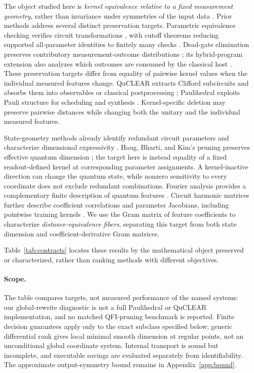 \documentclass[a4paper,twocolumn,11pt,unpublished]{quantumarticle}
\begin{document}
The object studied here is \emph{kernel equivalence relative to a fixed
measurement geometry}, rather than invariance under symmetries of
the input data \cite{larocca,meyer}. Prior methods address several
distinct preservation targets. Parametric equivalence checking
verifies circuit transformations \cite{peham}, with cutoff theorems
reducing supported all-parameter identities to finitely many checks
\cite{rosswesley}. Dead-gate elimination preserves contributory
measurement-outcome distributions \cite{deadgate}; its hybrid-program
extension also analyzes which outcomes are consumed by the classical
host \cite{deadgatejournal}. These preservation targets differ from
equality of pairwise kernel values when the individual measured
features change. QuCLEAR extracts
Clifford subcircuits and absorbs them into observables or classical
postprocessing \cite{quclear}; Paulihedral exploits Pauli structure
for scheduling and synthesis \cite{paulihedral}. Kernel-specific
deletion may preserve pairwise distances while changing both the
unitary and the individual measured features.

State-geometry methods already identify redundant circuit parameters
and characterize dimensional expressivity \cite{funcke,haug}.
Haug, Bharti, and Kim's pruning preserves effective quantum dimension
\cite{haug}; the target here is instead equality of a fixed
readout-defined kernel at corresponding parameter assignments.
A kernel-inactive direction can change the quantum state, while
nonzero sensitivity to every coordinate does not exclude redundant
combinations. Fourier analysis provides a complementary finite
description of quantum features \cite{schuldFourier}. Circuit harmonic
matrices further describe coefficient correlations and parameter
Jacobians, including pointwise training kernels \cite{CHM}.
We use the Gram matrix of feature coefficients to characterize
\emph{distance-equivalence fibers}, separating this target from both
state dimension and coefficient-derivative Gram matrices.

Table~\ref{tab:contracts} locates these results
by the mathematical object preserved or characterized, rather than
ranking methods with different objectives.

\paragraph{Scope.}
The table compares targets, not measured performance of the named
systems: our global-rewrite diagnostic is not a full Paulihedral or
QuCLEAR implementation, and no matched QFI-pruning benchmark is reported.
Finite decision guarantees apply only to the exact subclass specified
below; generic differential rank gives local minimal smooth dimension
at regular points, not an unconditional global coordinate system.
Internal transport is sound but incomplete, and executable savings
are evaluated separately from identifiability. The approximate
output-symmetry bound remains in Appendix~\ref{app:bound}.
\end{document}
